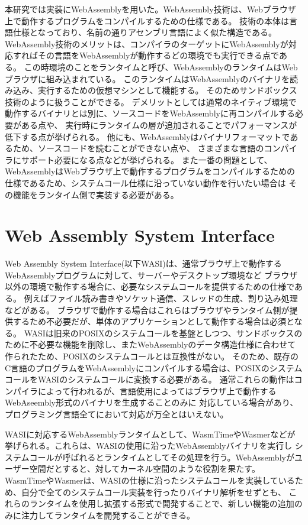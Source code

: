 \documentclass[a4paper,11pt]{jreport}
\begin{document}
本研究では実装にWebAssemblyを用いた。WebAssembly技術は、Webブラウザ上で動作するプログラムをコンパイルするための仕様である。
技術の本体は言語仕様となっており、名前の通りアセンブリ言語によく似た構造である。
WebAssembly技術のメリットは、コンパイラのターゲットにWebAssemblyが対応すればその言語をWebAssemblyが動作するどの環境でも実行できる点である。
この時環境のことをランタイムと呼び、WebAssemblyのランタイムはWebブラウザに組み込まれている。
このランタイムはWebAssemblyのバイナリを読み込み、実行するための仮想マシンとして機能する。
そのためサンドボックス技術のように扱うことができる。
デメリットとしては通常のネイティブ環境で動作するバイナリとは別に、ソースコードをWebAssemblyに再コンパイルする必要がある点や、
実行時にランタイムの層が追加されることでパフォーマンスが低下する点が挙げられる。
他にも、WebAssemblyはバイナリフォーマットであるため、ソースコードを読むことができない点や、
さまざまな言語のコンパイラにサポート必要になる点などが挙げられる。
また一番の問題として、WebAssemblyはWebブラウザ上で動作するプログラムをコンパイルするための仕様であるため、システムコール仕様に沿っていない動作を行いたい場合は
その機能をランタイム側で実装する必要がある。

\section{Web Assembly System Interface}

Web Assembly System Interface(以下WASI)\cite{wasi}は、通常ブラウザ上で動作するWebAssemblyプログラムに対して、サーバーやデスクトップ環境など
ブラウザ以外の環境で動作する場合に、必要なシステムコールを提供するための仕様である。
例えばファイル読み書きやソケット通信、スレッドの生成、割り込み処理などがある。
ブラウザで動作する場合はこれらはブラウザやランタイム側が提供するため不必要だが、単体のアプリケーションとして動作する場合は必須となる。
WASIは旧来のPOSIXのシステムコールを基盤としつつ、サンドボックスのために不必要な機能を削除し、またWebAssemblyのデータ構造仕様に合わせて
作られたため、POSIXのシステムコールとは互換性がない。
そのため、既存のC言語のプログラムをWebAssemblyにコンパイルする場合は、POSIXのシステムコールをWASIのシステムコールに変換する必要がある。
通常これらの動作はコンパイラによって行われるが、言語使用によってはブラウザ上で動作するWebAseembly形式のバイナリを生成することのみに
対応している場合があり、プログラミング言語全てにおいて対応が万全とはいえない。

WASIに対応するWebAssemblyランタイムとして、WasmTime\cite{wasmtime}やWasmer\cite{wasmer}などが挙げられる。これらは、WASIの使用に沿ったWebAssemblyバイナリを実行し
システムコールが呼ばれるとランタイムとしてその処理を行う。WebAssemblyがユーザー空間だとすると、対してカーネル空間のような役割を果たす。
WasmTimeやWasmerは、WASIの仕様に沿ったシステムコールを実装しているため、自分で全てのシステムコール実装を行ったりバイナリ解析をせずとも、
これらのランタイムを使用し拡張する形式で開発することで、新しい機能の追加のみに注力してランタイムを開発することができる。
\end{document}
